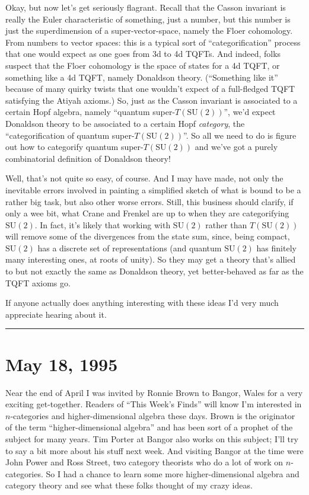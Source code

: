 \documentclass{article}
\begin{document}
Okay, but now let's get seriously flagrant. Recall that the Casson
invariant is really the Euler characteristic of something, just a
number, but this number is just the superdimension of a
super-vector-space, namely the Floer cohomology. From numbers to vector
spaces: this is a typical sort of ``categorification'' process that one
would expect as one goes from 3d to 4d TQFTs. And indeed, folks suspect
that the Floer cohomology is the space of states for a 4d TQFT, or
something like a 4d TQFT, namely Donaldson theory. (``Something like
it'' because of many quirky twists that one wouldn't expect of a
full-fledged TQFT satisfying the Atiyah axioms.) So, just as the Casson
invariant is associated to a certain Hopf algebra, namely ``quantum
super-\(T(\mathrm{SU}(2))\)'', we'd expect Donaldson theory to be
associated to a certain Hopf \emph{category}, the ``categorification of
quantum super-\(T(\mathrm{SU}(2))\)''. So all we need to do is figure
out how to categorify quantum super-\(T(\mathrm{SU}(2))\) and we've got
a purely combinatorial definition of Donaldson theory!

Well, that's not quite so easy, of course. And I may have made, not only
the inevitable errors involved in painting a simplified sketch of what
is bound to be a rather big task, but also other worse errors. Still,
this business should clarify, if only a wee bit, what Crane and Frenkel
are up to when they are categorifying \(\mathrm{SU}(2)\). In fact, it's
likely that working with \(\mathrm{SU}(2)\) rather than
\(T(\mathrm{SU}(2))\) will remove some of the divergences from the state
sum, since, being compact, \(\mathrm{SU}(2)\) has a discrete set of
representations (and quantum \(\mathrm{SU}(2)\) has finitely many
interesting ones, at roots of unity). So they may get a theory that's
allied to but not exactly the same as Donaldson theory, yet
better-behaved as far as the TQFT axioms go.

If anyone actually does anything interesting with these ideas I'd very
much appreciate hearing about it.

\begin{center}\rule{0.5\linewidth}{0.5pt}\end{center}
\hypertarget{week53}{%
\section{May 18, 1995}\label{week53}}

Near the end of April I was invited by Ronnie Brown to Bangor, Wales for
a very exciting get-together. Readers of ``This Week's Finds'' will know
I'm interested in \(n\)-categories and higher-dimensional algebra these
days. Brown is the originator of the term ``higher-dimensional algebra''
and has been sort of a prophet of the subject for many years. Tim Porter
at Bangor also works on this subject; I'll try to say a bit more about
his stuff next week. And visiting Bangor at the time were John Power and
Ross Street, two category theorists who do a lot of work on
\(n\)-categories. So I had a chance to learn some more
higher-dimensional algebra and category theory and see what these folks
thought of my crazy ideas.
\end{document}
